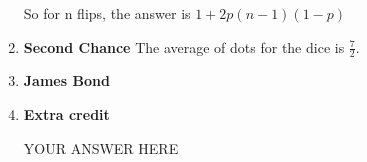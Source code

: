\documentclass[12pt,fleqn]{article}
\begin{document}
\begin{enumerate}
  So for n flips, the answer is $1 + 2p(n - 1)(1 - p)$
  
  
  \newpage
  \item \textbf{Second Chance}
  The average of dots for the dice is $\frac{7}{2}$. 
  
  
  \newpage
  \item \textbf{James Bond}
 
 
  \newpage
  \item \textbf{Extra credit}
  
  YOUR ANSWER HERE


\end{enumerate}
\end{document}

